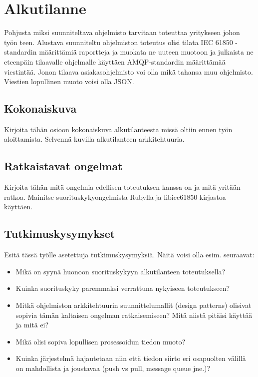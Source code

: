 \chapter{Alkutilanne}
\label{ch:alkutilanne}
Pohjusta miksi suunniteltava ohjelmisto tarvitaan toteuttaa yritykseen johon työn teen. Alustava suunniteltu ohjelmiston toteutus olisi tilata IEC 61850 -standardin määrittämiä raportteja ja muokata ne uuteen muotoon ja julkaista ne eteenpäin tilaavalle ohjelmalle käyttäen AMQP-standardin määrittämää viestintää. Jonon tilaava asiakasohjelmisto voi olla mikä tahansa muu ohjelmisto. Viestien lopullinen muoto voisi olla JSON.

\section{Kokonaiskuva}
Kirjoita tähän osioon kokonaiskuva alkutilanteesta missä oltiin ennen työn aloittamista. Selvennä kuvilla alkutilanteen arkkitehtuuria.

\section{Ratkaistavat ongelmat}
Kirjoita tähän mitä ongelmia edellisen toteutuksen kanssa on ja mitä yritään ratkoa. Mainitse suorituskykyongelmista Rubylla ja libiec61850-kirjastoa käyttäen.

\section{Tutkimuskysymykset}
Esitä tässä työlle asetettuja tutkimuskysymyksiä. Näitä voisi olla esim. seuraavat:
\begin{itemize}
	\item Mikä on syynä huonoon suorituskykyyn alkutilanteen toteutuksella?
	\item Kuinka suorituskyky paremmaksi verrattuna nykyiseen toteutukseen?
	\item Mitkä ohjelmiston arkkitehtuurin suunnittelumallit (design patterns) olisivat sopivia tämän kaltaisen ongelman ratkaisemiseen? Mitä niistä pitäisi käyttää ja mitä ei?
	\item Mikä olisi sopiva lopullisen prosessoidun tiedon muoto?
	\item Kuinka järjestelmä hajautetaan niin että tiedon siirto eri osapuolten välillä on mahdollista ja joustavaa (push vs pull, message queue jne.)?
\end{itemize}